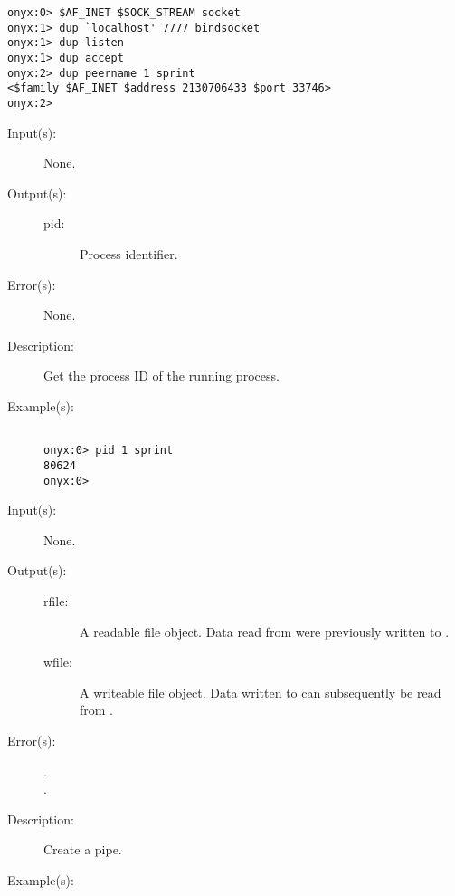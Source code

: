 \begin{description}
\begin{description}
\begin{verbatim}
onyx:0> $AF_INET $SOCK_STREAM socket
onyx:1> dup `localhost' 7777 bindsocket
onyx:1> dup listen
onyx:1> dup accept
onyx:2> dup peername 1 sprint
<$family $AF_INET $address 2130706433 $port 33746>
onyx:2>
		\end{verbatim}
	\end{description}
\label{systemdict:pid}
\item[{\onyxop{--}{pid}{pid}}: ]
	\begin{description}\item[]
	\item[Input(s): ] None.
	\item[Output(s): ]
		\begin{description}\item[]
		\item[pid: ]
			Process identifier.
		\end{description}
	\item[Error(s): ] None.
	\item[Description: ]
		Get the process ID of the running process.
	\item[Example(s): ]\begin{verbatim}

onyx:0> pid 1 sprint
80624
onyx:0>
		\end{verbatim}
	\end{description}
\label{systemdict:pipe}
\item[{\onyxop{--}{pipe}{rfile wfile}}: ]
	\begin{description}\item[]
	\item[Input(s): ] None.
	\item[Output(s): ]
		\begin{description}\item[]
		\item[rfile: ]
			A readable file object.  Data read from 
			were previously written to .
		\item[wfile: ]
			A writeable file object.  Data written to 
			can subsequently be read from .
		\end{description}
	\item[Error(s): ]
		\begin{description}\item[]
		\item[.]
		\item[.]
		\end{description}
	\item[Description: ]
		Create a pipe.
	\item[Example(s): ]\begin{verbatim}


\end{verbatim}
\end{description}
\end{description}
